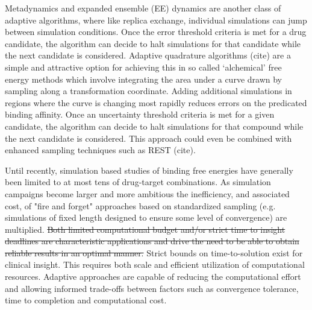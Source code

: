 Metadynamics and expanded ensemble (EE) dynamics are another class of 
adaptive algorithms, where like replica exchange, individual simulations 
can jump between simulation conditions. Once the error threshold 
criteria is met for a drug candidate, the algorithm can decide to halt 
simulations for that candidate while the next candidate is considered. 
Adaptive quadrature algorithms (cite) are a simple and attractive option for 
achieving this in so called `alchemical' free energy methods which involve 
integrating the area under a curve drawn by sampling along a transformation 
coordinate. Adding additional simulations in regions where the curve is 
changing most rapidly reduces errors on the predicated binding affinity. 
Once an uncertainty threshold criteria is met for a given candidate, the 
algorithm can decide to halt simulations for that compound while the next 
candidate is considered. This approach could even be combined with enhanced 
sampling techniques such as REST (cite). 

Until recently, simulation based studies of binding free energies have
generally been limited to at most tens of drug-target combinations. As
simulation campaigns become larger and more ambitious the inefficiency, and
associated cost, of "fire and forget" approaches based on standardized
sampling (e.g. simulations of fixed length designed to ensure some level of
convergence) are multiplied. \sout{Both limited computational budget and/or
strict time to insight deadlines are characteristic 
applications and drive the need to be able to obtain reliable results in an
optimal manner.} 
Strict bounds on time-to-solution exist for clinical insight. This requires
both scale and efficient utilization of computational resources. Adaptive
approaches are capable of reducing the computational effort and allowing
informed trade-offs between factors such as convergence tolerance, time to
completion and computational cost. 


